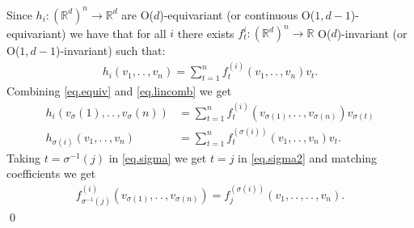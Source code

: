 \documentclass{article}
\theoremstyle{Hogg}
\renewcommand{\ldots}{.\,.\,}
\begin{document}
Since $h_i: (\mathbb R^d)^n\to \mathbb R^d$ are 
O($d$)-equivariant (or continuous O($1,d-1$)-equivariant) we have that for all $i$ there exists $f_t^{i}:(\mathbb R^d)^n\to \mathbb R$ O($d$)-invariant (or O($1,d-1$)-invariant) such that:
\begin{align}
    h_i(v_1,\ldots, v_n) = \sum_{t=1}^n f_t^{(i)}(v_1,\ldots, v_n) v_t. \label{eq.lincomb}
\end{align}
Combining \eqref{eq.equiv} and \eqref{eq.lincomb} we get
\begin{align}
    h_i(v_\sigma(1),\ldots, v_\sigma(n)) &= \sum_{t=1}^n f_t^{(i)}(v_{\sigma(1)}, \ldots, v_{\sigma(n)}) v_{\sigma(t)} \label{eq.sigma}\\
    h_{\sigma(i)}(v_1,\ldots, v_n)
    &= \sum_{t=1}^n f_t^{(\sigma(i))}(v_1,\ldots, v_n) v_{t} \label{eq.sigma2} .
\end{align}
Taking $t=\sigma^{-1}(j)$ in \eqref{eq.sigma} we get $t=j$ in \eqref{eq.sigma2} and matching coefficients we get
\begin{align}
f^{(i)}_{\sigma^{-1}(j)}(v_{\sigma(1)}, \ldots, v_{\sigma(n)})= f^{(\sigma(i))}_j(v_1,\ldots, \ldots, v_n).
\end{align}
\qed
\end{document}
